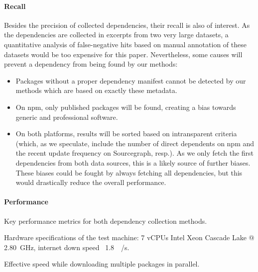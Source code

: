 \paragraph{Recall}
\label{sec:evaluation/resqu1/recall}

Besides the precision of collected dependencies, their recall is also of interest.
As the dependencies are collected in excerpts from two very large datasets, a quantitative analysis of false-negative hits based on manual annotation of these datasets would be too expensive for this paper.
Nevertheless, some causes will prevent a dependency from being found by our methods:

\begin{itemize}
	\item Packages without a proper dependency manifest cannot be detected by our methods which are based on exactly these metadata.
	\item On npm, only published packages will be found, creating a bias towards generic and professional software.
	\item On both platforms, results will be sorted based on intransparent criteria (which, as we speculate, include the number of direct dependents on npm and the recent update frequency on Sourcegraph, resp.).
		As we only fetch the first dependencies from both data sources, this is a likely source of further biases.
		These biases could be fought by always fetching all dependencies, but this would drastically reduce the overall performance.
\end{itemize}

\paragraph{Performance}
\label{sec:evaluation/resqu1/performance}

\begin{table}
	\caption{Key performance metrics for both dependency collection methods.}
	\label{tab:evaluation/resqu1/performance}

	\centering
	\begin{threeparttable}
		\renewcommand\theadfont{\normalsize}
		
		\begin{tablenotes}
			\footnotesize
			\item[\alphtnotetext{1}] Hardware specifications of the test machine: 7 vCPUs Intel Xeon Cascade Lake @ \SI{2.80}{\giga\hertz}, internet down speed ~\SI{1.8}{\giga\bit/\second}.
			\item[\alphtnotetext{2}] Effective speed while downloading multiple packages in parallel.
		\end{tablenotes}
	\end{threeparttable}
\end{table}

